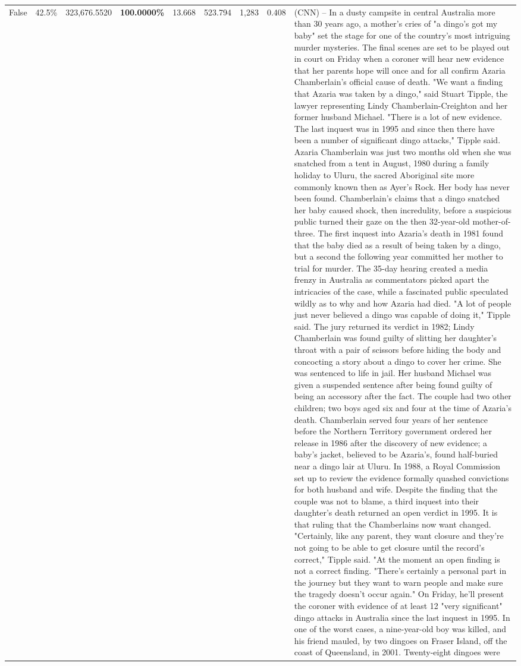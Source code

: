 \begin{table}[H]
\begin{tabular}{lllrlllll}
False & 42.5\% & 323,676.5520 & \bfseries \color{red} 100.0000\% & 13.668 & 523.794 & 1,283 & 0.408 & (CNN) -- In a dusty campsite in central Australia more than 30 years ago, a mother's cries of "a dingo's got my baby" set the stage for one of the country's most intriguing murder mysteries. The final scenes are set to be played out in court on Friday when a coroner will hear new evidence that her parents hope will once and for all confirm Azaria Chamberlain's official cause of death. "We want a finding that Azaria was taken by a dingo," said Stuart Tipple, the lawyer representing Lindy Chamberlain-Creighton and her former husband Michael. "There is a lot of new evidence. The last inquest was in 1995 and since then there have been a number of significant dingo attacks," Tipple said. Azaria Chamberlain was just two months old when she was snatched from a tent in August, 1980 during a family holiday to Uluru, the sacred Aboriginal site more commonly known then as Ayer's Rock. Her body has never been found. Chamberlain's claims that a dingo snatched her baby caused shock, then incredulity, before a suspicious public turned their gaze on the then 32-year-old mother-of-three. The first inquest into Azaria's death in 1981 found that the baby died as a result of being taken by a dingo, but a second the following year committed her mother to trial for murder. The 35-day hearing created a media frenzy in Australia as commentators picked apart the intricacies of the case, while a fascinated public speculated wildly as to why and how Azaria had died. "A lot of people just never believed a dingo was capable of doing it," Tipple said. The jury returned its verdict in 1982; Lindy Chamberlain was found guilty of slitting her daughter's throat with a pair of scissors before hiding the body and concocting a story about a dingo to cover her crime. She was sentenced to life in jail. Her husband Michael was given a suspended sentence after being found guilty of being an accessory after the fact. The couple had two other children; two boys aged six and four at the time of Azaria's death. Chamberlain served four years of her sentence before the Northern Territory government ordered her release in 1986 after the discovery of new evidence; a baby's jacket, believed to be Azaria's, found half-buried near a dingo lair at Uluru. In 1988, a Royal Commission set up to review the evidence formally quashed convictions for both husband and wife. Despite the finding that the couple was not to blame, a third inquest into their daughter's death returned an open verdict in 1995. It is that ruling that the Chamberlains now want changed. "Certainly, like any parent, they want closure and they're not going to be able to get closure until the record's correct," Tipple said. "At the moment an open finding is not a correct finding. "There's certainly a personal part in the journey but they want to warn people and make sure the tragedy doesn't occur again." On Friday, he'll present the coroner with evidence of at least 12 "very significant" dingo attacks in Australia since the last inquest in 1995. In one of the worst cases, a nine-year-old boy was killed, and his friend mauled, by two dingoes on Fraser Island, off the coast of Queensland, in 2001. Twenty-eight dingoes were 
\end{tabular}
\end{table}
